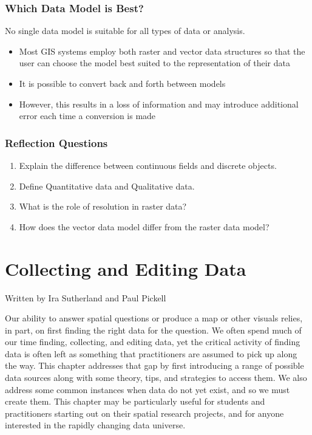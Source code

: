\documentclass[
]{book}
\providecommand{\tightlist}{%
  \setlength{\itemsep}{0pt}\setlength{\parskip}{0pt}}
\begin{document}
\hypertarget{which-data-model-is-best}{%
\subsection{Which Data Model is Best?}\label{which-data-model-is-best}}

No single data model is suitable for all types of data or analysis.

\begin{itemize}
\tightlist
\item
  Most GIS systems employ both raster and vector data structures so that the user can choose the model best suited to the representation of their data
\item
  It is possible to convert back and forth between models
\item
  However, this results in a loss of information and may introduce additional error each time a conversion is made
\end{itemize}

\hypertarget{reflection-questions-2}{%
\subsection*{Reflection Questions}\label{reflection-questions-2}}

\begin{enumerate}
\def\labelenumi{\arabic{enumi}.}
\tightlist
\item
  Explain the difference between continuous fields and discrete objects.
\item
  Define Quantitative data and Qualitative data.
\item
  What is the role of resolution in raster data?
\item
  How does the vector data model differ from the raster data model?
\end{enumerate}

\hypertarget{collecting-and-editing-data}{%
\chapter{Collecting and Editing Data}\label{collecting-and-editing-data}}

Written by
Ira Sutherland and Paul Pickell

Our ability to answer spatial questions or produce a map or other visuals relies, in part, on first finding the right data for the question. We often spend much of our time finding, collecting, and editing data, yet the critical activity of finding data is often left as something that practitioners are assumed to pick up along the way. This chapter addresses that gap by first introducing a range of possible data sources along with some theory, tips, and strategies to access them. We also address some common instances when data do not yet exist, and so we must create them. This chapter may be particularly useful for students and practitioners starting out on their spatial research projects, and for anyone interested in the rapidly changing data universe.
\end{document}
